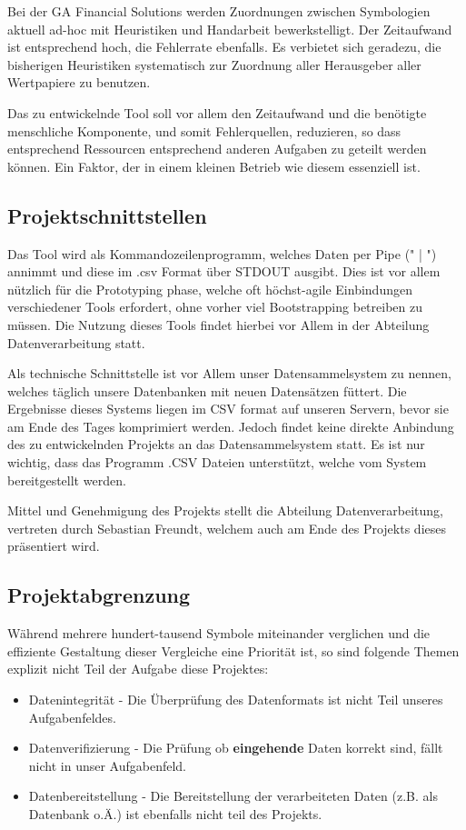 Bei der GA Financial Solutions werden Zuordnungen zwischen Symbologien
aktuell ad-hoc mit Heuristiken und Handarbeit bewerkstelligt.  Der
Zeitaufwand ist entsprechend hoch, die Fehlerrate ebenfalls.  Es
verbietet sich geradezu, die bisherigen Heuristiken systematisch zur
Zuordnung aller Herausgeber aller Wertpapiere zu benutzen.\par

Das zu entwickelnde Tool soll vor allem den Zeitaufwand und die benötigte
menschliche Komponente, und somit Fehlerquellen, reduzieren, so dass entsprechend Ressourcen entsprechend
anderen Aufgaben zu geteilt werden können.
Ein Faktor, der in einem kleinen Betrieb wie diesem essenziell ist.\par

\subsection{Projektschnittstellen}
Das Tool wird als Kommandozeilenprogramm, welches
Daten per Pipe (" | ") annimmt und diese im .csv Format über STDOUT ausgibt. Dies ist vor allem
nützlich für die Prototyping phase, welche oft höchst-agile Einbindungen
verschiedener Tools erfordert, ohne vorher viel Bootstrapping betreiben
zu müssen. Die Nutzung dieses Tools findet hierbei vor Allem in der Abteilung
Datenverarbeitung statt.\par

Als technische Schnittstelle ist vor Allem unser Datensammelsystem zu nennen,
welches täglich unsere Datenbanken mit neuen Datensätzen füttert. Die Ergebnisse
dieses Systems liegen im CSV format auf unseren Servern, bevor sie am Ende des
Tages komprimiert werden. Jedoch findet keine direkte Anbindung des zu entwickelnden Projekts an das Datensammelsystem statt.
Es ist nur wichtig, dass das Programm .CSV Dateien unterstützt, welche vom System bereitgestellt werden.\par

Mittel und Genehmigung des Projekts stellt die Abteilung Datenverarbeitung,
vertreten durch Sebastian Freundt, welchem auch am Ende des Projekts dieses
präsentiert wird.\par

\subsection{Projektabgrenzung}
Während mehrere hundert-tausend Symbole miteinander verglichen und die
effiziente Gestaltung dieser Vergleiche eine Priorität ist, so sind folgende
Themen explizit nicht Teil der Aufgabe diese Projektes:

\begin{itemize}
    \item Datenintegrität - Die Überprüfung des Datenformats ist nicht Teil unseres Aufgabenfeldes.
    \item Datenverifizierung - Die Prüfung ob \textbf{eingehende} Daten korrekt sind, fällt nicht in unser Aufgabenfeld.
    \item Datenbereitstellung - Die Bereitstellung der verarbeiteten Daten (z.B. als Datenbank o.Ä.) ist ebenfalls nicht teil des Projekts.
\end{itemize}
\clearpage


